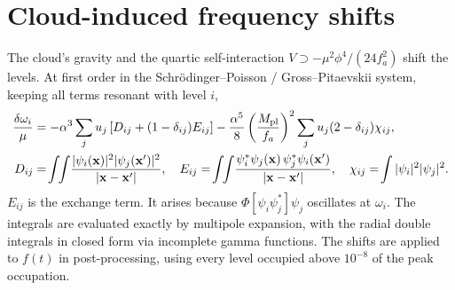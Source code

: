 \documentclass[11pt]{article}
\begin{document}
\section{Cloud-induced frequency shifts}
The cloud's gravity and the quartic self-interaction $V\supset-\mu^2\phi^4/(24f_a^2)$ shift the levels. At first order in the Schrödinger--Poisson / Gross--Pitaevskii system, keeping all terms resonant with level $i$,
\begin{align}
\frac{\delta\omega_i}{\mu}&=-\alpha^3\sum_j u_j\left[D_{ij}+(1-\delta_{ij})E_{ij}\right]-\frac{\alpha^5}{8}\left(\frac{M_{\rm pl}}{f_a}\right)^2\sum_j u_j(2-\delta_{ij})\chi_{ij},\\
D_{ij}&=\!\int\!\!\int\!\frac{|\psi_i(\mathbf x)|^2|\psi_j(\mathbf x')|^2}{|\mathbf x-\mathbf x'|},\quad
E_{ij}=\!\int\!\!\int\!\frac{\psi_i^*\psi_j(\mathbf x)\,\psi_j^*\psi_i(\mathbf x')}{|\mathbf x-\mathbf x'|},\quad
\chi_{ij}=\!\int|\psi_i|^2|\psi_j|^2 .
\end{align}
$E_{ij}$ is the exchange term. It arises because $\Phi[\psi_i\psi_j^*]\psi_j$ oscillates at $\omega_i$. The integrals are evaluated exactly by multipole expansion, with the radial double integrals in closed form via incomplete gamma functions. The shifts are applied to $f(t)$ in post-processing, using every level occupied above $10^{-8}$ of the peak occupation.
\end{document}
